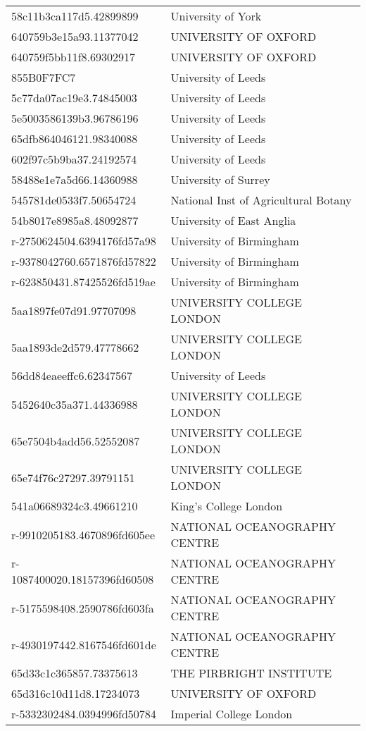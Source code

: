 \begin{tabular}{ll}
58c11b3ca117d5.42899899 & University of York \\
640759b3e15a93.11377042 & UNIVERSITY OF OXFORD \\
640759f5bb11f8.69302917 & UNIVERSITY OF OXFORD \\
855B0F7FC7 & University of Leeds \\
5c77da07ac19e3.74845003 & University of Leeds \\
5e5003586139b3.96786196 & University of Leeds \\
65dfb864046121.98340088 & University of Leeds \\
602f97c5b9ba37.24192574 & University of Leeds \\
58488e1e7a5d66.14360988 & University of Surrey \\
545781de0533f7.50654724 & National Inst of Agricultural Botany \\
54b8017e8985a8.48092877 & University of East Anglia \\
r-2750624504.6394176fd57a98 & University of Birmingham \\
r-9378042760.6571876fd57822 & University of Birmingham \\
r-623850431.87425526fd519ae & University of Birmingham \\
5aa1897fe07d91.97707098 & UNIVERSITY COLLEGE LONDON \\
5aa1893de2d579.47778662 & UNIVERSITY COLLEGE LONDON \\
56dd84eaeeffc6.62347567 & University of Leeds \\
5452640c35a371.44336988 & UNIVERSITY COLLEGE LONDON \\
65e7504b4add56.52552087 & UNIVERSITY COLLEGE LONDON \\
65e74f76c27297.39791151 & UNIVERSITY COLLEGE LONDON \\
541a06689324c3.49661210 & King's College London \\
r-9910205183.4670896fd605ee & NATIONAL OCEANOGRAPHY CENTRE \\
r-1087400020.18157396fd60508 & NATIONAL OCEANOGRAPHY CENTRE \\
r-5175598408.2590786fd603fa & NATIONAL OCEANOGRAPHY CENTRE \\
r-4930197442.8167546fd601de & NATIONAL OCEANOGRAPHY CENTRE \\
65d33c1c365857.73375613 & THE PIRBRIGHT INSTITUTE \\
65d316c10d11d8.17234073 & UNIVERSITY OF OXFORD \\
r-5332302484.0394996fd50784 & Imperial College London \\

\end{tabular}
